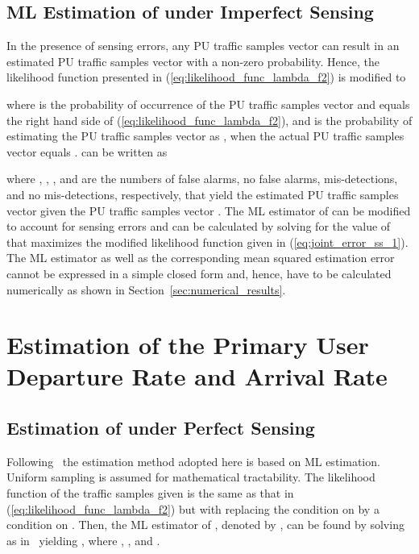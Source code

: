 \documentclass[11pt,draftclsnofoot,journal,onecolumn]{IEEEtran}
\begin{document}
\subsection{ML Estimation of  under Imperfect Sensing}
\label{sec:ml_u_se}

In the presence of sensing errors, any PU traffic samples vector  can result in an estimated PU traffic samples vector  with a non-zero probability. Hence, the likelihood function presented in (\ref{eq:likelihood_func_lambda_f2}) is modified to

where  is the probability of occurrence of the PU traffic samples vector  and equals the right hand side of (\ref{eq:likelihood_func_lambda_f2}), and  is the probability of estimating the PU traffic samples vector as , when the actual PU traffic samples vector equals .  can be written as

where , , , and  are the numbers of false alarms, no false alarms, mis-detections, and no mis-detections, respectively, that yield the estimated PU traffic samples vector  given the PU traffic samples vector . The ML estimator of  can be modified to account for sensing errors and can be calculated by solving for the value of  that maximizes the modified likelihood function given in (\ref{eq;joint_error_ss_1}). The ML estimator as well as the corresponding mean squared estimation error cannot be expressed in a simple closed form and, hence, have to be calculated numerically as shown in Section~\ref{sec:numerical_results}.

\section{Estimation of the Primary User Departure Rate  and Arrival Rate }
\label{sec:lambda_f_estimation}

\subsection{Estimation of  under Perfect Sensing}
\label{sec:lambda_f_estimation_ML}

Following~\cite[Sec. 6.1]{kim_tmc_2008} the estimation method adopted here is based on ML estimation. Uniform sampling is assumed for mathematical tractability. The likelihood function of the traffic samples given  is the same as that in (\ref{eq:likelihood_func_lambda_f2}) but with replacing the condition on  by a condition on . Then, the ML estimator of , denoted by , can be found by solving  as in~\cite[Sec. 6.1]{kim_tmc_2008} yielding , where , , and .
\end{document}
